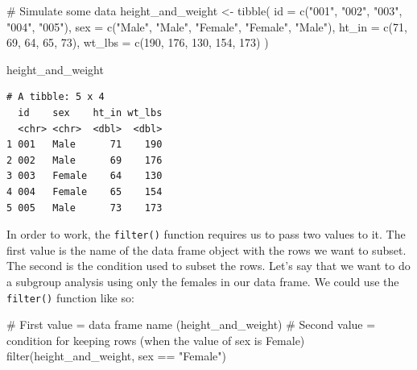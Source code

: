 \documentclass[
  letterpaper,
  DIV=11,
  numbers=noendperiod]{scrreprt}
\newenvironment{Shaded}{\begin{snugshade}}{\end{snugshade}}
\newcommand{\AttributeTok}[1]{\textcolor[rgb]{0.40,0.45,0.13}{#1}}
\newcommand{\CommentTok}[1]{\textcolor[rgb]{0.37,0.37,0.37}{#1}}
\newcommand{\DecValTok}[1]{\textcolor[rgb]{0.68,0.00,0.00}{#1}}
\newcommand{\FunctionTok}[1]{\textcolor[rgb]{0.28,0.35,0.67}{#1}}
\newcommand{\NormalTok}[1]{\textcolor[rgb]{0.00,0.23,0.31}{#1}}
\newcommand{\OtherTok}[1]{\textcolor[rgb]{0.00,0.23,0.31}{#1}}
\newcommand{\SpecialCharTok}[1]{\textcolor[rgb]{0.37,0.37,0.37}{#1}}
\newcommand{\StringTok}[1]{\textcolor[rgb]{0.13,0.47,0.30}{#1}}
\begin{document}
\begin{Shaded}
\begin{Highlighting}[]
\CommentTok{\# Simulate some data}
\NormalTok{height\_and\_weight }\OtherTok{\textless{}{-}} \FunctionTok{tibble}\NormalTok{(}
  \AttributeTok{id     =} \FunctionTok{c}\NormalTok{(}\StringTok{"001"}\NormalTok{, }\StringTok{"002"}\NormalTok{, }\StringTok{"003"}\NormalTok{, }\StringTok{"004"}\NormalTok{, }\StringTok{"005"}\NormalTok{),}
  \AttributeTok{sex    =} \FunctionTok{c}\NormalTok{(}\StringTok{"Male"}\NormalTok{, }\StringTok{"Male"}\NormalTok{, }\StringTok{"Female"}\NormalTok{, }\StringTok{"Female"}\NormalTok{, }\StringTok{"Male"}\NormalTok{),}
  \AttributeTok{ht\_in  =} \FunctionTok{c}\NormalTok{(}\DecValTok{71}\NormalTok{, }\DecValTok{69}\NormalTok{, }\DecValTok{64}\NormalTok{, }\DecValTok{65}\NormalTok{, }\DecValTok{73}\NormalTok{),}
  \AttributeTok{wt\_lbs =} \FunctionTok{c}\NormalTok{(}\DecValTok{190}\NormalTok{, }\DecValTok{176}\NormalTok{, }\DecValTok{130}\NormalTok{, }\DecValTok{154}\NormalTok{, }\DecValTok{173}\NormalTok{)}
\NormalTok{)}

\NormalTok{height\_and\_weight}
\end{Highlighting}
\end{Shaded}

\begin{verbatim}
# A tibble: 5 x 4
  id    sex    ht_in wt_lbs
  <chr> <chr>  <dbl>  <dbl>
1 001   Male      71    190
2 002   Male      69    176
3 003   Female    64    130
4 004   Female    65    154
5 005   Male      73    173
\end{verbatim}

In order to work, the \texttt{filter()} function requires us to pass two
values to it. The first value is the name of the data frame object with
the rows we want to subset. The second is the condition used to subset
the rows. Let's say that we want to do a subgroup analysis using only
the females in our data frame. We could use the \texttt{filter()}
function like so:

\begin{Shaded}
\begin{Highlighting}[]
\CommentTok{\# First value = data frame name (height\_and\_weight)}
\CommentTok{\# Second value = condition for keeping rows (when the value of sex is Female)}
\FunctionTok{filter}\NormalTok{(height\_and\_weight, sex }\SpecialCharTok{==} \StringTok{"Female"}\NormalTok{)}
\end{Highlighting}
\end{Shaded}
\end{document}
